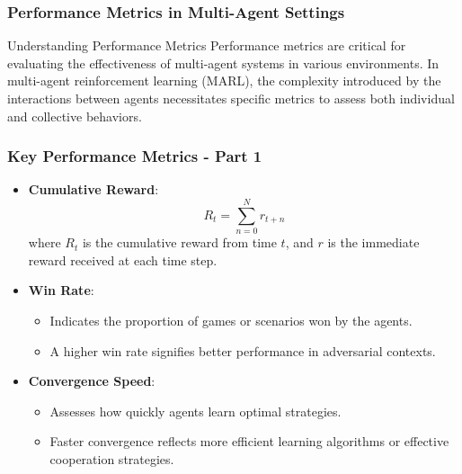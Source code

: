 \documentclass[aspectratio=169]{beamer}
\begin{document}
\begin{frame}[fragile]
    \frametitle{Performance Metrics in Multi-Agent Settings}
    \begin{block}{Understanding Performance Metrics}
        Performance metrics are critical for evaluating the effectiveness of multi-agent systems in various environments. In multi-agent reinforcement learning (MARL), the complexity introduced by the interactions between agents necessitates specific metrics to assess both individual and collective behaviors.
    \end{block}
\end{frame}

\begin{frame}[fragile]
    \frametitle{Key Performance Metrics - Part 1}
    \begin{itemize}
        \item \textbf{Cumulative Reward}:
            \begin{equation}
                R_t = \sum_{n=0}^{N} r_{t+n}
            \end{equation}
            where \( R_t \) is the cumulative reward from time \( t \), and \( r \) is the immediate reward received at each time step.
        
        \item \textbf{Win Rate}:
            \begin{itemize}
                \item Indicates the proportion of games or scenarios won by the agents.
                \item A higher win rate signifies better performance in adversarial contexts.
            \end{itemize}
        
        \item \textbf{Convergence Speed}:
            \begin{itemize}
                \item Assesses how quickly agents learn optimal strategies.
                \item Faster convergence reflects more efficient learning algorithms or effective cooperation strategies.
            \end{itemize}
    \end{itemize}
\end{frame}
\end{document}
